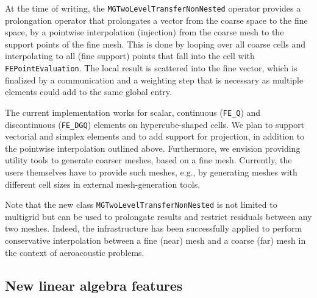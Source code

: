 \documentclass{ansarticle-preprint}
\begin{document}
At the time of writing, the \texttt{MGTwoLevelTransferNonNested} operator provides a prolongation operator
that prolongates a vector from the coarse space to the fine space,
by a pointwise interpolation (injection) from the coarse mesh to the support points of the fine mesh. This is done
by looping over all coarse cells and interpolating to all (fine support) points that fall into the cell with
\texttt{FEPointEvaluation}. The local result is scattered into the fine vector, which is finalized by a
communication and a weighting step that is necessary as multiple elements could add to the same global entry.


The current implementation works for scalar, continuous (\texttt{FE\_Q})
and discontinuous (\texttt{FE\_DGQ}) elements on hypercube-shaped cells. We plan to support
vectorial and simplex elements and to add support
for projection, in addition to the pointwise interpolation outlined
above. Furthermore, we envision providing utility tools to generate
coarser
meshes, based on a fine mesh. Currently, the users themselves
have to provide such meshes,
e.g., by generating meshes with different cell sizes in external mesh-generation tools.

Note that the new class \texttt{MGTwoLevelTransferNonNested} is not limited to
multigrid but can be used to prolongate results and restrict residuals between any
two meshes. Indeed, the infrastructure has been successfully applied to perform
conservative interpolation between a fine (near) mesh and a coarse (far) mesh in the
context of aeroacoustic problems.


\subsection{New linear algebra features}\label{sec:lac}
\end{document}
